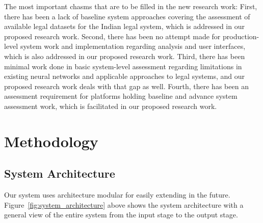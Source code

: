 \documentclass[preprint,12pt]{elsarticle}
\begin{document}
The most important chasms that are to be filled in the new research work: First, there has been a lack of baseline system approaches covering the assessment of available legal datasets for the Indian legal system, which is addressed in our proposed research work. Second, there has been no attempt made for production-level system work and implementation regarding analysis and user interfaces, which is also addressed in our proposed research work. Third, there has been minimal work done in basic system-level assessment regarding limitations in existing neural networks and applicable approaches to legal systems, and our proposed research work deals with that gap as well. Fourth, there has been an assessment requirement for platforms holding baseline and advance system assessment work, which is facilitated in our proposed research work.

\section{Methodology}

\subsection{System Architecture}

Our system uses architecture modular for easily extending in the future. Figure~\ref{fig:system_architecture} above shows the system architecture with a general view of the entire system from the input stage to the output stage.
\end{document}
